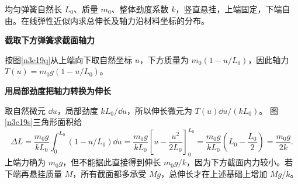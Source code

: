 \begin{question}\begin{example}[弹簧自身重力造成的伸长]\label{n3e19}
均匀弹簧自然长 $L_0$、质量 $m_0$、整体劲度系数 $k$，竖直悬挂，上端固定，下端自由。在线弹性近似内求总伸长及轴力沿材料坐标的分布。
\end{example}\end{question}
\begin{solution}\textbf{截取下方弹簧求截面轴力}\par\nobreak
按图\ref{n3e19q}从上端向下取自然坐标 $u$，下方质量为 $m_0(1-u/L_0)$，因此轴力 $T(u)=m_0g(1-u/L_0)$。

\par\medskip{}\noindent\textbf{用局部劲度把轴力转换为伸长}\par\nobreak
取自然微元 $\dd u$，局部劲度 $kL_0/\dd u$，所以伸长微元为 $T(u)\dd u/(kL_0)$。
图\ref{n3e19s}三角形面积给
\[
\Delta L=\frac{m_0g}{kL_0}\int_0^{L_0}(1-u/L_0)\dd u
=\frac{m_0g}{kL_0}\left[u-\frac{u^2}{2L_0}\right]_0^{L_0}
=\frac{m_0g}{kL_0}\left(L_0-\frac{L_0}{2}\right)
=\frac{m_0g}{2k}.
\]
上端力确为 $m_0g$，但不能据此直接得到伸长 $m_0g/k$，因为下方截面内力较小。若下端再悬挂质量 $M$，所有截面都多承受 $Mg$，总伸长才在上述基础上增加 $Mg/k$。
\end{solution}

